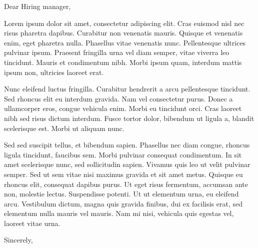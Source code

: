 \documentclass[a4paper,english]{friggeri-letter}
\makeatletter
\newcommand{\closingnew}[1]{\par\nobreak\vspace{\parskip}%
  \stopbreaks
  \noindent
  \parbox{\indentedwidth}{\raggedright
       \ignorespaces #1\\[6\medskipamount]%
       \ifx\@empty\fromsig
           \fromname
       \else \fromsig \fi\strut}%
   \par}
\makeatother
\begin{document}

\address{
   Somewhere str. 20 \\
   12345 Town \\
   Country
}



\opening{Dear Hiring manager,}

\begin{flushleft}
 Lorem ipsum dolor sit amet, consectetur adipiscing elit. Cras euismod nisl nec risus pharetra dapibus. Curabitur non venenatis mauris. Quisque et venenatis enim, eget pharetra nulla. Phasellus vitae venenatis nunc. Pellentesque ultrices pulvinar ipsum. Praesent fringilla urna vel diam semper, vitae viverra leo tincidunt. Mauris et condimentum nibh. Morbi ipsum quam, interdum mattis ipsum non, ultricies laoreet erat.

Nunc eleifend luctus fringilla. Curabitur hendrerit a arcu pellentesque tincidunt. Sed rhoncus elit eu interdum gravida. Nam vel consectetur purus. Donec a ullamcorper eros, congue vehicula enim. Morbi eu tincidunt orci. Cras laoreet nibh sed risus dictum interdum. Fusce tortor dolor, bibendum ut ligula a, blandit scelerisque est. Morbi ut aliquam nunc.

Sed sed suscipit tellus, et bibendum sapien. Phasellus nec diam congue, rhoncus ligula tincidunt, faucibus sem. Morbi pulvinar consequat condimentum. In sit amet scelerisque nunc, sed sollicitudin sapien. Vivamus quis leo ut velit pulvinar semper. Sed ut sem vitae nisi maximus gravida et sit amet metus. Quisque eu rhoncus elit, consequat dapibus purus. Ut eget risus fermentum, accumsan ante non, molestie lectus. Suspendisse potenti. Ut ut elementum urna, eu eleifend arcu. Vestibulum dictum, magna quis gravida finibus, dui ex facilisis erat, sed elementum nulla mauris vel mauris. Nam mi nisi, vehicula quis egestas vel, laoreet vitae urna. 
\end{flushleft}

\closingnew{Sincerely,}
\end{document}
